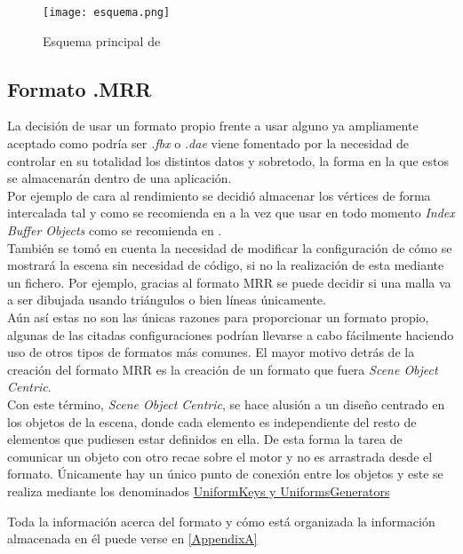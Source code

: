 \begin{figure}[h!]
\begin{center}
\texttt{[image: esquema.png]}
\end{center}
\caption[Esquema principal de \robotto]{Esquema principal de \robotto}
\label{fig:Esquema}
\end{figure}

\subsection{Formato .MRR}
La decisión de usar un formato propio frente a usar alguno ya ampliamente aceptado como podría ser \textit{.fbx} o \textit{.dae} viene fomentado por la necesidad de controlar en su totalidad los distintos datos y sobretodo, la forma en la que estos se almacenarán dentro de una aplicación.\\

Por ejemplo de cara al rendimiento se decidió almacenar los vértices de forma intercalada tal y como se recomienda en \cite{1misc} a la vez que usar en todo momento \textit{Index Buffer Objects} como se recomienda en \cite{2misc}.\\
También se tomó en cuenta la necesidad de modificar la configuración de cómo se mostrará la escena sin necesidad de código, si no la realización de esta mediante un fichero. Por ejemplo, gracias al formato MRR se puede decidir si una malla va a ser dibujada usando triángulos o bien líneas únicamente.\\

Aún así estas no son las únicas razones para proporcionar un formato propio, algunas de las citadas configuraciones podrían llevarse a cabo fácilmente haciendo uso de otros tipos de formatos más comunes. El mayor motivo detrás de la creación del formato MRR es la creación de un formato que fuera \textit{Scene Object Centric}.\\
Con este término, \textit{Scene Object Centric}, se hace alusión a un diseño centrado en los objetos de la escena, donde cada elemento es independiente del resto de elementos que pudiesen estar definidos en ella. De esta forma la tarea de comunicar un objeto con otro recae sobre el motor y no es arrastrada desde el formato.
Únicamente hay un único punto de conexión entre los objetos y este se realiza mediante los denominados \hyperref[susec:UnifKeyUnifGen]{UniformKeys y UniformsGenerators}

Toda la información acerca del formato y cómo está organizada la información almacenada en él puede verse en \ref{AppendixA}

